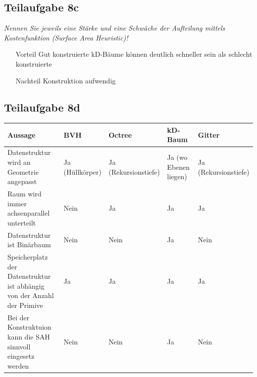 \documentclass[a4paper]{scrartcl}
\begin{document}
\subsection*{Teilaufgabe 8c}
\textit{Nennen Sie jeweils eine Stärke und eine Schwäche der Aufteilung mittels Kostenfunktion (Surface Area Heuristic)!}

\begin{itemize}
    \item[Vorteil] Gut konstruierte kD-Bäume können deutlich schneller sein als schlecht konstruierte
    \item[Nachteil] Konstruktion aufwendig
\end{itemize}


\subsection*{Teilaufgabe 8d}
\begin{table}[H]
    \begin{tabular}{p{4cm}p{2.2cm}p{2.2cm}p{2.2cm}p{2.2cm}}\toprule
    Aussage                                                                 & BVH             & Octree               & kD-Baum               & Gitter               \\\midrule
    Datenstruktur wird an Geometrie angepasst                               & Ja (Hüllkörper) & Ja (Rekursionstiefe) & Ja (wo Ebenen liegen) & Ja (Rekursionstiefe) \\
    Raum wird immer achsen\-parallel unterteilt                               & Nein            & Ja                   & Ja                    & Ja                   \\
    Datenstruktur ist Binär\-baum                                             & Nein            & Nein                 & Ja                    & Nein                 \\
    Speicherplatz der Daten\-struktur ist abhängig von der Anzahl der Primive & Ja              & Ja                   & Ja                    & Ja                   \\
    Bei der Konstruktuion kann die SAH sinnvoll eingesetz werden            & Nein            & Nein                 & Ja                    & Nein                 \\\bottomrule
    \end{tabular}
\end{table}
\end{document}
